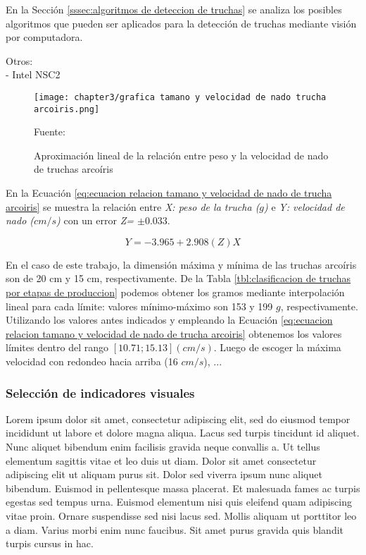 En la Sección \ref{sssec:algoritmos de deteccion de truchas}  se analiza los posibles algoritmos que pueden ser aplicados para la detección de truchas mediante visión por computadora.

Otros:\\
- Intel NSC2 \\

\begin{figure}[H]
	\centering
	\texttt{[image: chapter3/grafica tamano y velocidad de nado trucha arcoiris.png]}
	\caption{Aproximación lineal de la relación entre peso y la velocidad de nado de truchas arcoíris}
	\begin{myflushleftportland}
		Fuente: \cite{Fry1970}
	\end{myflushleftportland}
	\label{fig:grafica tamano y velocidad de nado trucha arcoiris}
\end{figure}


En la Ecuación \ref{eq:ecuacion relacion tamano y velocidad de nado de trucha arcoiris} se muestra la relación entre \textit{X: peso de la trucha ($g$)} e \textit{Y: velocidad de nado ($cm/s$)} con un error \textit{Z= $\pm 0.033$}. 

\begin{equation} \label{eq:ecuacion relacion tamano y velocidad de nado de trucha arcoiris}
	Y=-3.965+2.908(Z)X
\end{equation}

En el caso de este trabajo, la dimensión máxima y mínima de las truchas arcoíris son de 20 cm y 15 cm, respectivamente. De la Tabla \ref{tbl:clasificacion de truchas por etapas de produccion} podemos obtener los gramos mediante interpolación lineal para cada límite: valores mínimo-máximo son 153 y 199 \textit{$g$}, respectivamente. Utilizando los valores antes indicados y empleando la Ecuación \ref{eq:ecuacion relacion tamano y velocidad de nado de trucha arcoiris} obtenemos los valores límites dentro del rango $[10.71; 15.13] (cm/s)$. Luego de escoger la máxima velocidad con redondeo hacia arriba (16 $cm/s$), ...


\subsubsection{Selección de indicadores visuales} %

Lorem ipsum dolor sit amet, consectetur adipiscing elit, sed do eiusmod tempor incididunt ut labore et dolore magna aliqua. Lacus sed turpis tincidunt id aliquet. Nunc aliquet bibendum enim facilisis gravida neque convallis a. Ut tellus elementum sagittis vitae et leo duis ut diam. Dolor sit amet consectetur adipiscing elit ut aliquam purus sit. Dolor sed viverra ipsum nunc aliquet bibendum. Euismod in pellentesque massa placerat. Et malesuada fames ac turpis egestas sed tempus urna. Euismod elementum nisi quis eleifend quam adipiscing vitae proin. Ornare suspendisse sed nisi lacus sed. Mollis aliquam ut porttitor leo a diam. Varius morbi enim nunc faucibus. Sit amet purus gravida quis blandit turpis cursus in hac.

